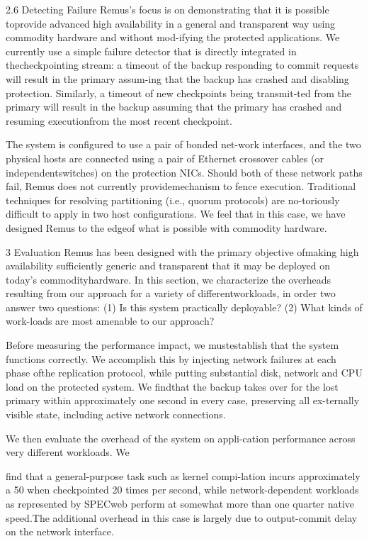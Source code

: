 2.6 Detecting Failure
Remus's focus is on demonstrating that it is possible toprovide advanced high availability in a general and transparent way using commodity hardware and without mod-ifying the protected applications. We currently use a
simple failure detector that is directly integrated in thecheckpointing stream: a timeout of the backup responding to commit requests will result in the primary assum-ing that the backup has crashed and disabling protection.
Similarly, a timeout of new checkpoints being transmit-ted from the primary will result in the backup assuming that the primary has crashed and resuming executionfrom the most recent checkpoint.

The system is configured to use a pair of bonded net-work interfaces, and the two physical hosts are connected
using a pair of Ethernet crossover cables (or independentswitches) on the protection NICs. Should both of these
network paths fail, Remus does not currently providemechanism to fence execution. Traditional techniques
for resolving partitioning (i.e., quorum protocols) are no-toriously difficult to apply in two host configurations. We
feel that in this case, we have designed Remus to the edgeof what is possible with commodity hardware.

3 Evaluation
Remus has been designed with the primary objective ofmaking high availability sufficiently generic and transparent that it may be deployed on today's commodityhardware. In this section, we characterize the overheads
resulting from our approach for a variety of differentworkloads, in order two answer two questions: (1) Is this
system practically deployable? (2) What kinds of work-loads are most amenable to our approach?

Before measuring the performance impact, we mustestablish that the system functions correctly. We accomplish this by injecting network failures at each phase ofthe replication protocol, while putting substantial disk,
network and CPU load on the protected system. We findthat the backup takes over for the lost primary within approximately one second in every case, preserving all ex-ternally visible state, including active network connections.

We then evaluate the overhead of the system on appli-cation performance across very different workloads. We

find that a general-purpose task such as kernel compi-lation incurs approximately a 50%
when checkpointed 20 times per second, while network-dependent workloads as represented by SPECweb perform at somewhat more than one quarter native speed.The additional overhead in this case is largely due to
output-commit delay on the network interface.

